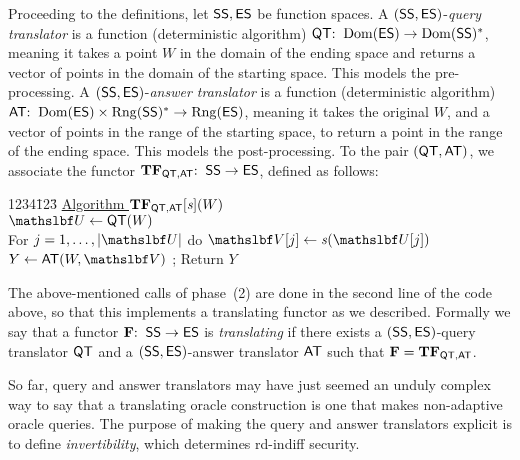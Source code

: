 Proceeding to the definitions, let $\mathsf{SS},\mathsf{ES}$ be function spaces. A $(\mathsf{SS},\mathsf{ES})$-\textit{query translator} is a function (deterministic algorithm) $\mathsf{QT}{:\;\;} \mathrm{Dom}(\mathsf{ES}) \to \mathrm{Dom}(\mathsf{SS})^*$, meaning it takes a point $W$ in the domain of the ending space and returns a vector of points in the domain of the starting space. This models the pre-processing. A $(\mathsf{SS},\mathsf{ES})$-\textit{answer translator} is a function (deterministic algorithm) $\mathsf{AT}{:\;\;}  \mathrm{Dom}(\mathsf{ES}) \times \mathrm{Rng}(\mathsf{SS})^* \to \mathrm{Rng}(\mathsf{ES})$, meaning it takes the original $W$, and a vector of points in the range of the starting space, to return a point in the range of the ending space. This models the post-processing. To the pair $(\mathsf{QT}, \mathsf{AT})$, we associate the functor $\mathbf{TF}_{\mathsf{QT},\mathsf{AT}}{:\;\;} \mathsf{SS}\to\mathsf{ES}$, defined as follows:
\begin{tabbing}
	1234\=123\=\kill
	\> \underline{Algorithm $\mathbf{TF}_{\mathsf{QT},\mathsf{AT}}[\mathit{s}](W)$}  \\[2pt]
	\> $\vecU\gets\QuT(W)$ \\
	\> For $j=1,\ldots,|\vecU|$ do $\vecV[j] \gets \aFunc{\functionIn}(\vecU[j])$ \comment{$\vecU[j]\in\Dom(\GenroSp{\functionInSet})$} \\
	\> $Y \gets \AnT(W,\vecV)$ ; Return $Y$
\end{tabbing}
The above-mentioned calls of phase~(2) are done in the second line of the code above, so that this implements a translating functor as we described. Formally we say that a functor $\mathbf{F} {:\;\;} \mathsf{SS}\to \mathsf{ES}$ 
is \textit{translating} if there exists a $(\mathsf{SS},\mathsf{ES})$-query translator $\mathsf{QT}$ and a $(\mathsf{SS},\mathsf{ES})$-answer translator $\mathsf{AT}$ such that $\mathbf{F} = \mathbf{TF}_{\mathsf{QT},\mathsf{AT}}$.

So far, query and answer translators may have  just seemed an unduly complex way to say that a translating oracle construction is one that makes non-adaptive oracle queries. The purpose of making the query and answer translators explicit is to define \textit{invertibility}, which determines rd-indiff security.
 
